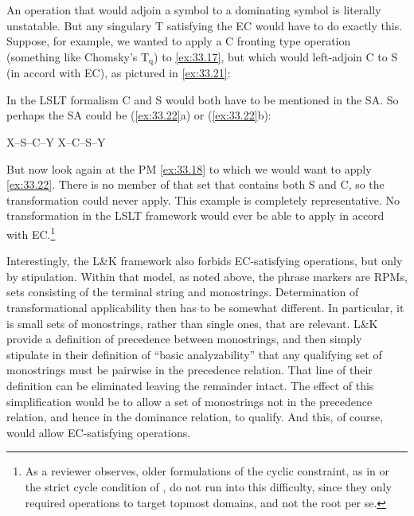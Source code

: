 \documentclass[output=paper]{langsci/langscibook}
\begin{document}
\ea\label{ex:33.20}
\z

An operation that would adjoin a symbol to a dominating symbol is literally
unstatable. But any singulary  T satisfying the \glsdesc{EC} would have
to do exactly this. Suppose, for example, we wanted to apply a C fronting type
operation (something like Chomsky's T$_\text{q}$) to \eqref{ex:33.17}, but
which would left-adjoin C to S (in accord with \gls{EC}), as pictured in
\eqref{ex:33.21}:

\ea\label{ex:33.21}
\z

In the LSLT formalism C and S would both have to be
mentioned in the \gls{SA}. So perhaps the \gls{SA} could be
(\ref{ex:33.22}a) or (\ref{ex:33.22}b):

\ea\label{ex:33.22}
    \ea X--S--C--Y
    \ex X--C--S--Y
    \z
\z

But now look again at the \gls{PM} \eqref{ex:33.18} to
which we would want to apply \eqref{ex:33.22}.  There is no member of that
set that contains both S and C, so the transformation could never apply. This
example is completely representative. No  transformation in the
LSLT framework would ever be able to apply in accord with
\gls{EC}.\footnote{As a reviewer observes, older formulations of the cyclic
    constraint, as in \citet{Chomsky1965} or the strict cycle condition of
\citet{Chomsky1973}, do not run into this difficulty, since they only required
operations to target topmost domains, and not the root per se.}

Interestingly, the L\&K framework also forbids EC-satisfying operations, but
only by stipulation. Within that model, as noted above, the phrase markers are
R\glspl{PM}, sets consisting of the terminal string and monostrings.
Determination of transformational applicability then has to be somewhat
different. In particular, it is small sets of monostrings, rather than single
ones, that are relevant. L\&K provide a definition of precedence between
monostrings, and then simply stipulate in their definition of ``basic
analyzability'' that any qualifying set of monostrings must be pairwise in the
precedence relation. That line of their definition can be eliminated leaving
the remainder intact. The effect of this simplification would be to allow a set
of monostrings not in the precedence relation, and hence in the dominance
relation, to qualify. And this, of course, would allow EC-satisfying
operations.
\end{document}
